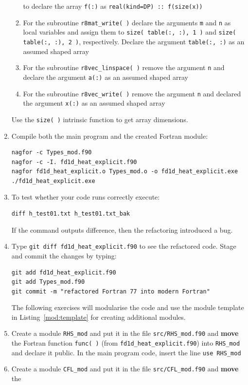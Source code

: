 \documentclass[12pt]{article}
\begin{document}
\begin{enumerate}
\begin{enumerate}
to declare the array \texttt{f(:)} as \texttt{real(kind=DP) ::\ f(size(x))}
\item For the subroutine \texttt{r8mat\_write( )} declare the arguments \texttt{m} and \texttt{n} as local variables
  and assign them
to \texttt{size( table(:, :), 1 )} and \texttt{size( table(:, :), 2 )}, respectively. Declare the argument \texttt{table(:, :)}
as an assumed shaped array
\item For the subroutine \texttt{r8vec\_linspace( )} remove the argument \texttt{n} and declare the argument \texttt{a(:)} as
an assumed shaped array
\item For the subroutine \texttt{r8vec\_write( )} remove the argument \texttt{n} and declared the argument \texttt{x(:)} as
an assumed shaped array
\end{enumerate}
Use the \texttt{size( )} intrinsic function to get array dimensions. 
\item Compile both the main program and the created Fortran module:
\begin{verbatim}
nagfor -c Types_mod.f90
nagfor -c -I. fd1d_heat_explicit.f90
nagfor fd1d_heat_explicit.o Types_mod.o -o fd1d_heat_explicit.exe
./fd1d_heat_explicit.exe
\end{verbatim}
\item To test whether your code runs correctly execute:
\begin{verbatim}
diff h_test01.txt h_test01.txt_bak
\end{verbatim}
If the command outputs difference, then the refactoring introduced a bug.
\item Type \texttt{git diff fd1d\_heat\_explicit.f90} to see the refactored code. Stage and commit
the changes by typing: 
\begin{verbatim}
git add fd1d_heat_explicit.f90
git add Types_mod.f90
git commit -m "refactored Fortran 77 into modern Fortran"
\end{verbatim}
The following exercises will modularise the code and use the module template in
  Listing~\ref{mod:template} for creating additional modules.
\item Create a module \texttt{RHS\_mod} and put it in the file \texttt{src/RHS\_mod.f90} and {\bf move} the 
Fortran function \texttt{func( )} (from \texttt{fd1d\_heat\_explicit.f90}) into \texttt{RHS\_mod} and declare it public. In the main program code, 
insert the line \texttt{use RHS\_mod} 
\item Create a module \texttt{CFL\_mod} and put it in the file \texttt{src/CFL\_mod.f90} and {\bf move} the

\end{enumerate}
\end{document}
